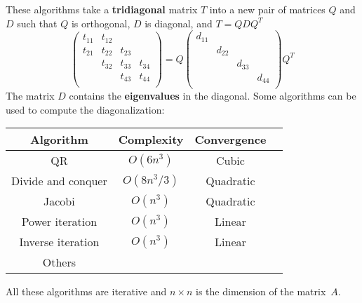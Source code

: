 \documentclass[11pt,a4paper]{article}
\newcommand*\mat[1]{ \begin{pmatrix} #1 \end{pmatrix}}
\begin{document}
These algorithms take a \textbf{tridiagonal} matrix $T$ into a new pair of 
matrices $Q$ and $D$ such that $Q$ is orthogonal, $D$ is diagonal, and $T = Q 
D Q^T$
%
$$
	\mat{
		t_{11} & t_{12} &        &        \\
		t_{21} & t_{22} & t_{23} &        \\
		       & t_{32} & t_{33} & t_{34} \\
		       &        & t_{43} & t_{44} \\
	}=
	Q
	\mat{
		d_{11} &        &        &        \\
		       & d_{22} &        &        \\
		       &        & d_{33} &        \\
		       &        &        & d_{44} \\
	}
	Q^T
$$
%
The matrix $D$ contains the \textbf{eigenvalues} in the diagonal. Some 
algorithms can be used to compute the diagonalization:
%
\begin{center}
\begin{tabular}{c c c c}
	\toprule
	Algorithm							& Complexity  & Convergence	\\
	\midrule
	QR                  & $O(6n^3)$ 	& Cubic 			\\
	Divide and conquer  & $O(8n^3/3)$ & Quadratic 	\\
	Jacobi              & $O(n^3)$    & Quadratic 	\\
	Power iteration			& $O(n^3)$    & Linear 			\\
	Inverse iteration	  & $O(n^3)$    & Linear 			\\
	Others							&             &          		\\
	\bottomrule
\end{tabular}
\end{center}
%
%
All these algorithms are iterative and $n \times n$ is the dimension of the 
matrix~$A$.
\end{document}
